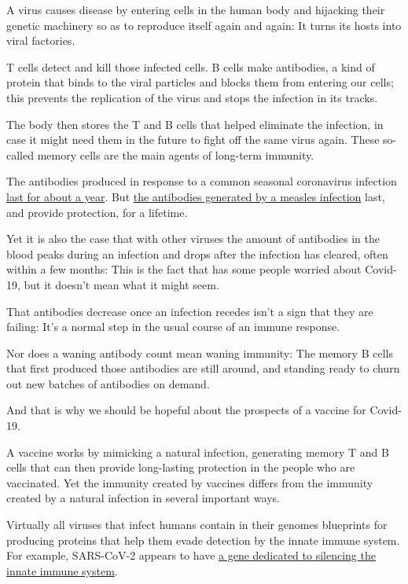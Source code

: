 A virus causes disease by entering cells in the human body and hijacking
their genetic machinery so as to reproduce itself again and again: It
turns its hosts into viral factories.

T cells detect and kill those infected cells. B cells make antibodies, a
kind of protein that binds to the viral particles and blocks them from
entering our cells; this prevents the replication of the virus and stops
the infection in its tracks.

The body then stores the T and B cells that helped eliminate the
infection, in case it might need them in the future to fight off the
same virus again. These so-called memory cells are the main agents of
long-term immunity.

The antibodies produced in response to a common seasonal coronavirus
infection
\href{https://www.ncbi.nlm.nih.gov/pmc/articles/PMC2271881/pdf/epidinfect00023-0213.pdf}{last
for about a year}. But
\href{https://www.cdc.gov/Vaccines/pubs/surv-manual/chpt07-measles.pdf}{the
antibodies generated by a measles infection} last, and provide
protection, for a lifetime.

Yet it is also the case that with other viruses the amount of antibodies
in the blood peaks during an infection and drops after the infection has
cleared, often within a few months: This is the fact that has some
people worried about Covid-19, but it doesn't mean what it might seem.

That antibodies decrease once an infection recedes isn't a sign that
they are failing: It's a normal step in the usual course of an immune
response.

Nor does a waning antibody count mean waning immunity: The memory B
cells that first produced those antibodies are still around, and
standing ready to churn out new batches of antibodies on demand.

And that is why we should be hopeful about the prospects of a vaccine
for Covid-19.

A vaccine works by mimicking a natural infection, generating memory T
and B cells that can then provide long-lasting protection in the people
who are vaccinated. Yet the immunity created by vaccines differs from
the immunity created by a natural infection in several important ways.

Virtually all viruses that infect humans contain in their genomes
blueprints for producing proteins that help them evade detection by the
innate immune system. For example, SARS-CoV-2 appears to have
\href{https://www.biorxiv.org/content/10.1101/2020.05.11.088179v1}{a
gene dedicated to silencing the innate immune system}.

